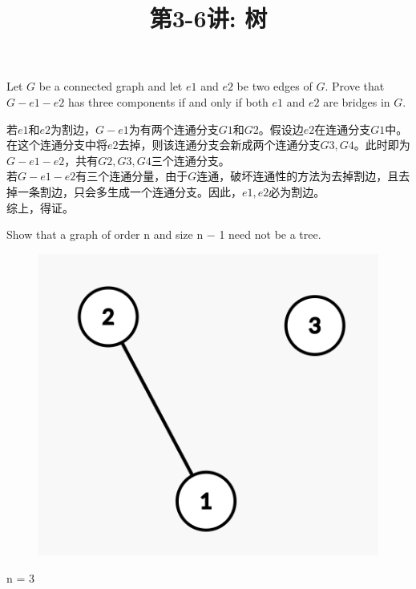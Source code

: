 \documentclass[a4paper, justified]{tufte-handout}
\title{第3-6讲: 树}
\date{\zhtoday} %
\begin{document}
\maketitle
\noplagiarism %
\begin{abstract}
\end{abstract}
\beginrequired

\begin{problem}[CZ 4.4]
Let $G$ be a connected graph and let $e1$ and $e2$ be two edges of $G$. Prove that $G − e1 − e2$ has three components if and only if both $e1$ and $e2$ are bridges in $G$.
\end{problem}

\begin{solution}
  若$e1$和$e2$为割边，$G-e1$为有两个连通分支$G1$和$G2$。假设边$e2$在连通分支$G1$中。在这个连通分支中将$e2$去掉，则该连通分支会新成两个连通分支$G3,G4$。此时即为$G-e1-e2$，共有$G2,G3,G4$三个连通分支。\\
  若$G-e1-e2$有三个连通分量，由于$G$连通，破坏连通性的方法为去掉割边，且去掉一条割边，只会多生成一个连通分支。因此，$e1,e2$必为割边。\\
  综上，得证。
\end{solution}

\begin{problem}[CZ 4.9]
Show that a graph of order n and size n − 1 need not be a tree.
\end{problem}

\begin{solution}
  \begin{figure}[htbp]
    \centering
    \includegraphics[width = 0.30\linewidth]{figs/a}
  \end{figure}

  n = 3
\end{solution}
\end{document}

